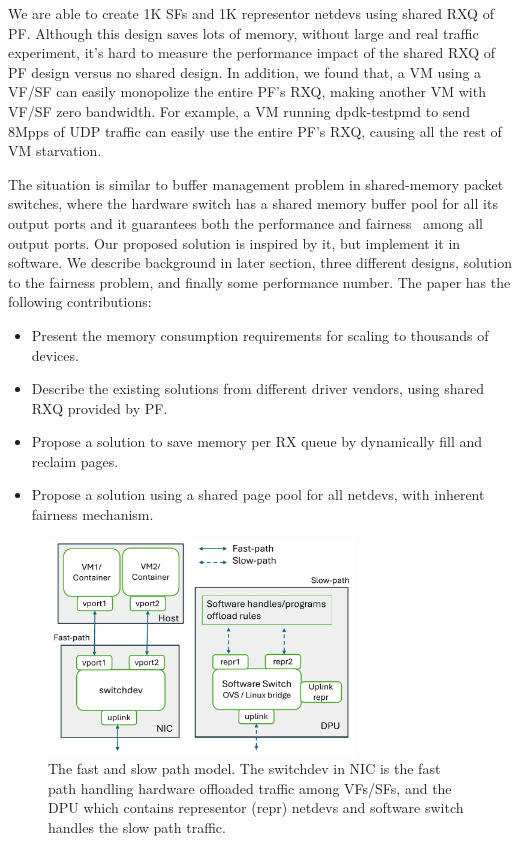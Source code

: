 \documentclass[letterpaper]{article}
\begin{document}
We are able to create 1K SFs and 1K representor netdevs using shared RXQ
of PF. Although this design saves lots of memory, without large and real traffic experiment, it's hard to measure the performance impact of the shared RXQ
of PF design versus no shared design.
In addition, we found that, a VM using a VF/SF can easily monopolize the
entire PF's RXQ, making another VM with VF/SF zero bandwidth.
For example, a VM
running dpdk-testpmd to send 8Mpps of UDP traffic can easily use the
entire PF's RXQ, causing all the rest of VM starvation.

The situation is similar to buffer management problem in shared-memory
packet switches, where the hardware switch has a shared memory buffer pool
for all its output ports and it guarantees both the performance and
fairness~\cite{devlinksb, queuelength} among all output ports.
Our proposed solution is inspired by it, but implement it in software.
We describe background in later section, three different designs,
solution to the fairness problem, and finally some performance
number. The paper has the following contributions:
\begin{itemize}
    \item Present the memory consumption requirements for scaling to
          thousands of devices.
    \item Describe the existing solutions from different driver vendors,
          using shared RXQ provided by PF.
    \item Propose a solution to save memory per RX queue by dynamically
          fill and reclaim pages.
    \item Propose a solution using a shared page pool for all netdevs,
          with inherent fairness mechanism.
\end{itemize}

\begin{figure}[h]
\includegraphics[width=3.2in]{arch.pdf}
\caption{The fast and slow path model. The switchdev in NIC is the fast path handling
hardware offloaded traffic among VFs/SFs, and the DPU which contains representor (repr) netdevs and software switch handles the slow path traffic.}
\label{fig:arch}
\end{figure}
\end{document}
